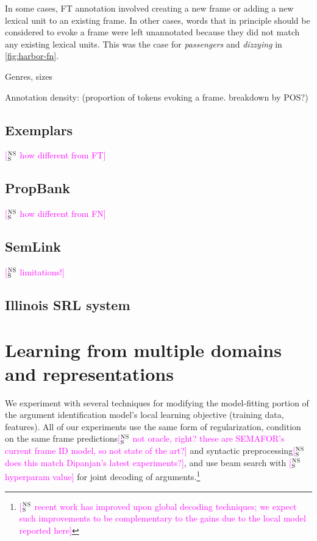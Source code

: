 \documentclass[11pt,a4paper]{article}
\newcommand{\ensuretext}[1]{#1}
\newcommand{\nssmarker}{\ensuretext{\textcolor{magenta}{\ensuremath{^{\textsc{NS}}_{\textsc{S}}}}}}
\newcommand{\arkcomment}[3]{\ensuretext{\textcolor{#3}{[#1 #2]}}}
\newcommand{\nss}[1]{\arkcomment{\nssmarker}{#1}{magenta}}
\begin{document}
In some cases, FT annotation involved creating a new frame or adding a new lexical unit to an existing frame. 
In other cases, words that in principle should be considered to evoke a frame were left unannotated 
because they did not match any existing lexical units. 
This was the case for \textit{passengers} and \textit{dizzying} in \cref{fig:harbor-fn}.

Genres, sizes

Annotation density: (proportion of tokens evoking a frame. breakdown by POS?)

\subsection{Exemplars}\label{sec:exemplars}

\nss{how different from FT}

\subsection{PropBank}\label{sec:pb}

\nss{how different from FN}

\subsection{SemLink}\label{sec:semlink}

\nss{limitations!}

\subsection{Illinois SRL system}



\section{Learning from multiple domains and representations}



We experiment with several techniques for modifying the model-fitting portion of 
the argument identification model's local learning objective 
(training data, features). All of our experiments use the same form of regularization, 
condition on the same frame predictions\nss{not oracle, right? these are SEMAFOR's current frame ID model, so not state of the art?} 
and syntactic preprocessing\nss{does this match Dipanjan's latest experiments?}, 
and use beam search with \nss{hyperparam value} for joint decoding of arguments.\footnote{\nss{recent work has improved upon global decoding techniques; we expect such improvements to be complementary to the gains due to the local model reported here}}
\end{document}
